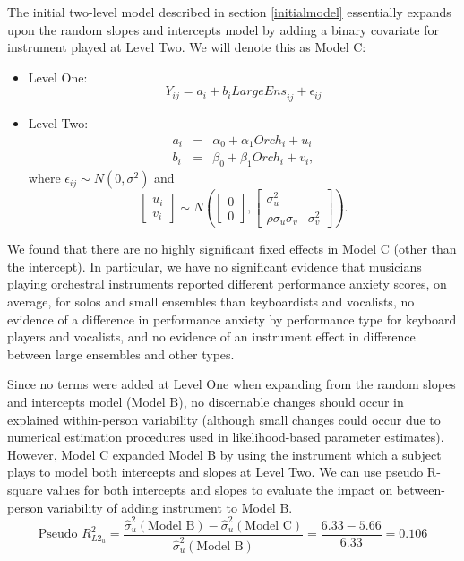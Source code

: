 \documentclass[
]{krantz}
\begin{document}
The initial two-level model described in section \ref{initialmodel} essentially expands upon the random slopes and intercepts model by adding a binary covariate for instrument played at Level Two. We will denote this as Model C:

\begin{itemize}
\item
  Level One:
  \begin{equation}
  Y_{ij} = a_{i}+b_{i}\textstyle{LargeEns}_{ij}+\epsilon_{ij}
  \label{eq:level1modelc}
  \end{equation}
\item
  Level Two:
  \begin{eqnarray*}
  a_{i} & = & \alpha_{0}+\alpha_{1}\textstyle{Orch}_{i}+u_{i} \\
  b_{i} & = & \beta_{0}+\beta_{1}\textstyle{Orch}_{i}+v_{i},
  \end{eqnarray*}
  where \(\epsilon_{ij}\sim N(0,\sigma^2)\) and
  \[ \left[ \begin{array}{c}
            u_{i} \\ v_{i}
          \end{array}  \right] \sim N \left( \left[
          \begin{array}{c}
            0 \\ 0
          \end{array} \right], \left[
          \begin{array}{cc}
            \sigma_{u}^{2} & \\
            \rho\sigma_{u}\sigma_{v} & \sigma_{v}^{2}
          \end{array} \right] \right). \]
\end{itemize}

We found that there are no highly significant fixed effects in Model C (other than the intercept). In particular, we have no significant evidence that musicians playing orchestral instruments reported different performance anxiety scores, on average, for solos and small ensembles than keyboardists and vocalists, no evidence of a difference in performance anxiety by performance type for keyboard players and vocalists, and no evidence of an instrument effect in difference between large ensembles and other types.

Since no terms were added at Level One when expanding from the random slopes and intercepts model (Model B), no discernable changes should occur in explained within-person variability (although small changes could occur due to numerical estimation procedures used in likelihood-based parameter estimates). However, Model C expanded Model B by using the instrument which a subject plays to model both intercepts and slopes at Level Two. We can use pseudo R-square values for both intercepts and slopes to evaluate the impact on between-person variability of adding instrument to Model B.
\begin{equation}
\textrm{Pseudo }R^2_{L2_u} = \frac{\hat{\sigma}_{u}^{2}(\textrm{Model B})-\hat{\sigma}_{u}^{2}(\textrm{Model C})}{\hat{\sigma}_{u}^{2}(\textrm{Model B})} = \frac{6.33-5.66}{6.33} = 0.106
\label{eq:pseudol0}
\end{equation}
\end{document}
